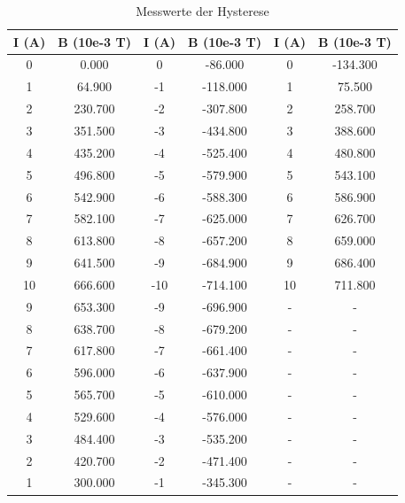 \begin{table}
\centering
\caption{Messwerte der Hysterese}
\begin{tabular}{c c c c c c}
  \toprule
   I (A) &  B (10e-3 T) &  I (A) &  B (10e-3 T) &  I (A) &  B (10e-3 T)\\
  \midrule
     0 &        0.000 &         0 &      -86.000 &   0 &     -134.300 \\
     1 &       64.900 &        -1 &     -118.000 &   1 &       75.500 \\
     2 &      230.700 &        -2 &     -307.800 &   2 &      258.700 \\
     3 &      351.500 &        -3 &     -434.800 &   3 &      388.600 \\
     4 &      435.200 &        -4 &     -525.400 &   4 &      480.800 \\
     5 &      496.800 &        -5 &     -579.900 &   5 &      543.100 \\
     6 &      542.900 &        -6 &     -588.300 &   6 &      586.900 \\
     7 &      582.100 &        -7 &     -625.000 &   7 &      626.700 \\
     8 &      613.800 &        -8 &     -657.200 &   8 &      659.000 \\
     9 &      641.500 &        -9 &     -684.900 &   9 &      686.400 \\
    10 &      666.600 &       -10 &     -714.100 &  10 &      711.800 \\
     9 &      653.300 &        -9 &     -696.900 &  -  &        -     \\
     8 &      638.700 &        -8 &     -679.200 &  -  &        -     \\
     7 &      617.800 &        -7 &     -661.400 &  -  &        -     \\
     6 &      596.000 &        -6 &     -637.900 &  -  &        -     \\
     5 &      565.700 &        -5 &     -610.000 &  -  &        -     \\
     4 &      529.600 &        -4 &     -576.000 &  -  &        -     \\
     3 &      484.400 &        -3 &     -535.200 &  -  &        -     \\
     2 &      420.700 &        -2 &     -471.400 &  -  &        -     \\
     1 &      300.000 &        -1 &     -345.300 &  -  &        -     \\
  \bottomrule
  \end{tabular}
\end{table}

